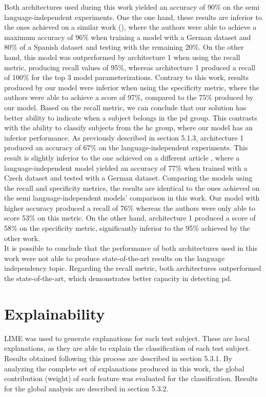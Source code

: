 Both architectures used during this work yielded an accuracy of 90\% on the semi language-independent experiments. One the one hand, these results are inferior to the ones achieved on a similar work (\cite{parkinson_three_languages}), where the authors were able to achieve a maximum accuracy of 96\% when training a model with a German dataset and 80\% of a Spanish dataset and testing with the remaining 20\%. On the other hand, this model was outperformed by architecture 1 when using the recall metric, producing recall values of 95\%, whereas architecture 1 produced a recall of 100\% for the top 3 model parameterizations. Contrary to this work, results produced by our model were inferior when using the specificity metric, where the authors were able to achieve a score of 97\%, compared to the 75\% produced by our model. Based on the recall metric, we can conclude that our solution has better ability to indicate when a subject belongs in the \gls{pd} group. This contrasts with the ability to classify subjects from the \gls{hc} group, where our model has an inferior performance. As previously described in section 5.1.3, architecture 1 produced an accuracy of 67\% on the language-independent experiments. This result is slightly inferior to the one achieved on a different article \cite{parkinson_three_languages}, where a language-independent model yielded an accuracy of 77\% when trained with a Czech dataset and tested with a German dataset. Comparing the models using the recall and specificity metrics, the results are identical to the ones achieved on the semi language-independent models' comparison in this work. Our model with higher accuracy produced a recall of 76\% whereas the authors were only able to score 53\% on this metric. On the other hand, architecture 1 produced a score of 58\% on the specificity metric, significantly inferior to the 95\% achieved by the other work. \\
It is possible to conclude that the performance of both architectures used in this work were not able to produce state-of-the-art results on the language independency topic. Regarding the recall metric, both architectures outperformed the state-of-the-art, which demonstrates better capacity in detecting \gls{pd}.

\section{Explainability}

LIME was used to generate explanations for each test subject. These are local explanations, as they are able to explain the classification of each test subject. Results obtained following this process are described in section 5.3.1. By analyzing the complete set of explanations produced in this work, the global contribution (weight) of each feature was evaluated for the classification. Results for the global analysis are described in section 5.3.2.

